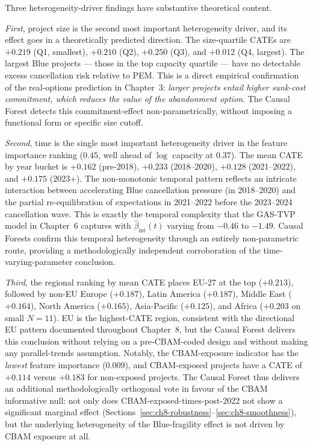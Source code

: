 \documentclass[11pt,a4paper]{article}
\begin{document}
Three heterogeneity-driver findings have substantive theoretical content.

\emph{First}, project size is the second most important heterogeneity driver, and its effect goes in a theoretically predicted direction. The size-quartile CATEs are $+0.219$ (Q1, smallest), $+0.210$ (Q2), $+0.250$ (Q3), and $+0.012$ (Q4, largest). The largest Blue projects --- those in the top capacity quartile --- have no detectable excess cancellation risk relative to PEM. This is a direct empirical confirmation of the real-options prediction in Chapter~3: \emph{larger projects entail higher sunk-cost commitment, which reduces the value of the abandonment option}. The Causal Forest detects this commitment-effect non-parametrically, without imposing a functional form or specific size cutoff.

\emph{Second}, time is the single most important heterogeneity driver in the feature importance ranking ($0.45$, well ahead of $\log$ capacity at $0.37$). The mean CATE by year bucket is $+0.162$ (pre-2018), $+0.233$ (2018--2020), $+0.128$ (2021--2022), and $+0.175$ (2023+). The non-monotonic temporal pattern reflects an intricate interaction between accelerating Blue cancellation pressure (in 2018--2020) and the partial re-equilibration of expectations in 2021--2022 before the 2023--2024 cancellation wave. This is exactly the temporal complexity that the GAS-TVP model in Chapter~6 captures with $\hat\beta_{\mathrm{int}}(t)$ varying from $-0.46$ to $-1.49$. Causal Forests confirm this temporal heterogeneity through an entirely non-parametric route, providing a methodologically independent corroboration of the time-varying-parameter conclusion.

\emph{Third}, the regional ranking by mean CATE places EU-27 at the top ($+0.213$), followed by non-EU Europe ($+0.187$), Latin America ($+0.187$), Middle East ($+0.164$), North America ($+0.165$), Asia-Pacific ($+0.125$), and Africa ($+0.203$ on small $N=11$). EU is the highest-CATE region, consistent with the directional EU pattern documented throughout Chapter~8, but the Causal Forest delivers this conclusion without relying on a pre-CBAM-coded design and without making any parallel-trends assumption. Notably, the CBAM-exposure indicator has the \emph{lowest} feature importance ($0.009$), and CBAM-exposed projects have a CATE of $+0.114$ versus $+0.183$ for non-exposed projects. The Causal Forest thus delivers an additional methodologically orthogonal vote in favour of the CBAM informative null: not only does CBAM-exposed-times-post-2022 not show a significant marginal effect (Sections~\ref{sec:ch8-robustness}--\ref{sec:ch8-smoothness}), but the underlying heterogeneity of the Blue-fragility effect is not driven by CBAM exposure at all.
\end{document}
